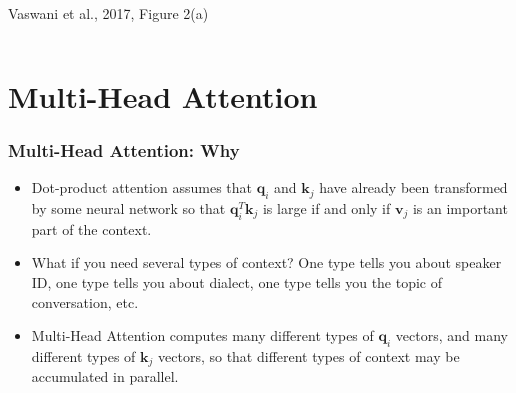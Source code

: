 \documentclass{beamer}
\begin{document}
\begin{frame}
\begin{columns}
\begin{column}{0.5\textwidth}
\begin{center}
        \begin{tiny}
          Vaswani et al., 2017, Figure 2(a)
        \end{tiny}
      \end{center}
    \end{column}
  \end{columns}
\end{frame}



\section{Multi-Head Attention}
\setcounter{subsection}{1}

\begin{frame}
  \frametitle{Multi-Head Attention: Why}

  \begin{itemize}
  \item
    Dot-product attention assumes that $\bm{q}_i$ and $\bm{k}_j$ have already
    been transformed by some neural network so that $\bm{q}_i^T\bm{k}_{j}$ is
    large if and only if $\bm{v}_j$ is an important part of the context.
  \item
    What if you need several types of context?  One type tells you
    about speaker ID, one type tells you about dialect, one type tells
    you the topic of conversation, etc.
  \item
    Multi-Head Attention computes many different types of $\bm{q}_i$ vectors,
    and many different types of $\bm{k}_j$ vectors, so that different types
    of context may be accumulated in parallel.
  \end{itemize}
\end{frame}
\end{document}

